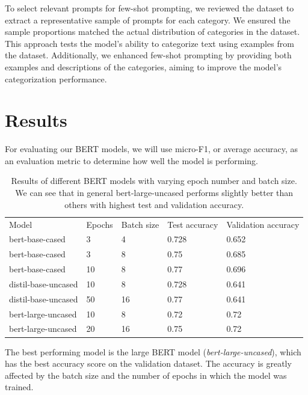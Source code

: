 \documentclass[fleqn,moreauthors,10pt]{ds_report}
\begin{document}
To select relevant prompts for few-shot prompting, we reviewed the dataset to extract a representative sample of prompts for each category. We ensured the sample proportions matched the actual distribution of categories in the dataset. This approach tests the model's ability to categorize text using examples from the dataset. Additionally, we enhanced few-shot prompting by providing both examples and descriptions of the categories, aiming to improve the model's categorization performance.


\section*{Results}
For evaluating our BERT models, we will use micro-F1, or average accuracy, as an evaluation metric to determine how well the model is performing. 

\begin{table}[h!]
\caption{Results of different BERT models with varying epoch number and batch size. We can see that in general bert-large-uncased performs slightly better than others with highest test and validation accuracy. }
\begin{adjustbox}{width=\columnwidth,center}
\begin{tabular}{lllll}
Model               & Epochs & Batch size & Test accuracy & Validation accuracy \\
bert-base-cased     & 3      & 4          & 0.728         & 0.652               \\
bert-base-cased     & 3      & 8          & 0.75          & 0.685               \\
bert-base-cased     & 10     & 8          & 0.77          & 0.696               \\
distil-base-uncased & 10     & 8          & 0.728         & 0.641               \\
distil-base-uncased & 50     & 16         & 0.77          & 0.641             \\
bert-large-uncased & 10     & 8         & 0.72     
& 0.72 \\
bert-large-uncased & 20     & 16         & 0.75        
& 0.72
\end{tabular}
\label{tab:results}
\end{adjustbox}
\end{table}


The best performing model is the large BERT model (\textit{bert-large-uncased}), which has the best accuracy score on the validation dataset. The accuracy is greatly affected by the batch size and the number of epochs in which the model was trained.
\end{document}
